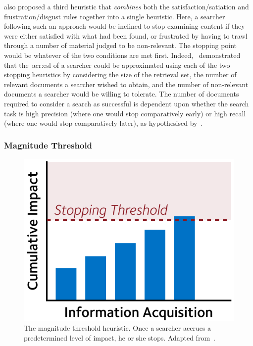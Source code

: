 \cite{kraft1979stopping_rules} also proposed a third heuristic that \emph{combines} both the satisfaction/satiation and frustration/disgust rules together into a single heuristic. Here, a searcher following such an approach would be inclined to stop examining content if they were either satisfied with what had been found, or frustrated by having to trawl through a number of material judged to be non-relevant. The stopping point would be whatever of the two conditions are met first. Indeed,~\cite{kraft1979stopping_rules} demonstrated that the~\gls{acr:esl} of a searcher could be approximated using each of the two stopping heuristics by considering the size of the retrieval set, the number of relevant documents a searcher wished to obtain, and the number of non-relevant documents a searcher would be willing to tolerate. The number of documents required to consider a search as successful is dependent upon whether the search task is high precision (where one would stop comparatively early) or high recall (where one would stop comparatively later), as hypothesised by~\cite{bates1984thirty_items}.

\subsubsection{Magnitude Threshold}\label{sec:stopping_background:heuristics:magnitude}
\begin{figure}
    \begin{center}
    \vspace*{-10mm}
    \includegraphics[width=1\textwidth]{figures/ch3-threshold.pdf}
    \end{center}
    \vspace*{-6mm}
    \caption[The magnitude threshold stopping heuristic]{The magnitude threshold heuristic. Once a searcher accrues a predetermined level of impact, he or she stops. Adapted from~\cite{browne2004stopping_rules}.}
    \label{fig:threshold}
\end{figure}

